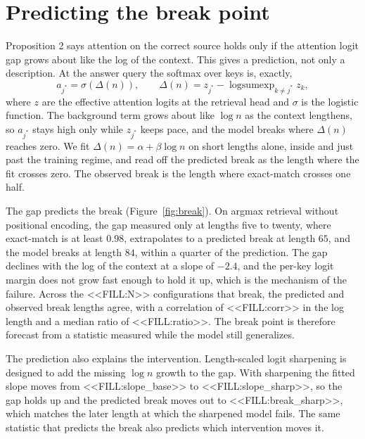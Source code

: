 
\section{Predicting the break point}
\label{sec:break}

Proposition 2 says attention on the correct source holds only if the attention logit gap grows about like the
log of the context.
This gives a prediction, not only a description.
At the answer query the softmax over keys is, exactly,
\begin{equation}
a_{j^*} = \sigma\!\left(\Delta(n)\right),
\qquad
\Delta(n) = z_{j^*} - \operatorname{logsumexp}_{k \neq j^*} z_k,
\label{eq:delta}
\end{equation}
where $z$ are the effective attention logits at the retrieval head and $\sigma$ is the logistic function.
The background term grows about like $\log n$ as the context lengthens, so $a_{j^*}$ stays high only while
$z_{j^*}$ keeps pace, and the model breaks where $\Delta(n)$ reaches zero.
We fit $\Delta(n) = \alpha + \beta \log n$ on short lengths alone, inside and just past the training regime,
and read off the predicted break as the length where the fit crosses zero.
The observed break is the length where exact-match crosses one half.

The gap predicts the break (Figure~\ref{fig:break}).
On argmax retrieval without positional encoding, the gap measured only at lengths five to twenty, where
exact-match is at least $0.98$, extrapolates to a predicted break at length $65$, and the model breaks at
length $84$, within a quarter of the prediction.
The gap declines with the log of the context at a slope of $-2.4$, and the per-key logit margin does not grow
fast enough to hold it up, which is the mechanism of the failure.
Across the <<FILL:N>> configurations that break, the predicted and observed break lengths agree, with a
correlation of <<FILL:corr>> in the log length and a median ratio of <<FILL:ratio>>.
The break point is therefore forecast from a statistic measured while the model still generalizes.

The prediction also explains the intervention.
Length-scaled logit sharpening is designed to add the missing $\log n$ growth to the gap.
With sharpening the fitted slope moves from <<FILL:slope_base>> to <<FILL:slope_sharp>>, so the gap holds up
and the predicted break moves out to <<FILL:break_sharp>>, which matches the later length at which the
sharpened model fails.
The same statistic that predicts the break also predicts which intervention moves it.

